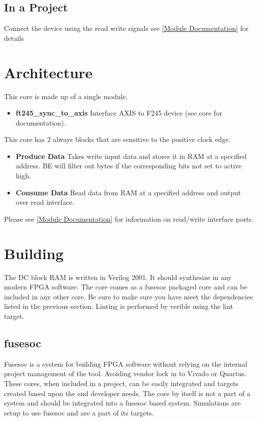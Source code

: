 

\subsection{In a Project}
\par
Connect the device using the read write signals see \ref{Module Documentation} for details

\section{Architecture}
\par
This core is made up of a single module.
\begin{itemize}
  \item \textbf{ft245\_sync\_to\_axis} Interface AXIS to F245 device (see core for documentation).
\end{itemize}

\par
This core has 2 always blocks that are sensitive to the positive clock edge.

\begin{itemize}
\item \textbf{Produce Data} Takes write input data and stores it in RAM at a specified address. BE will filter out bytes if the corresponding bits not set to active high.
\item \textbf{Consume Data} Read data from RAM at a specified address and output over read interface.
\end{itemize}

Please see \ref{Module Documentation} for information on read/write interface ports.

\section{Building}

\par
The DC block RAM is written in Verilog 2001. It should synthesize in any modern FPGA software. The core comes as a fusesoc packaged core and can be included in any other core. Be sure to make sure you have meet the dependencies listed in the previous section. Linting is performed by verible using the lint target.

\subsection{fusesoc}
\par
Fusesoc is a system for building FPGA software without relying on the internal project management of the tool. Avoiding vendor lock in to Vivado or Quartus.
These cores, when included in a project, can be easily integrated and targets created based upon the end developer needs. The core by itself is not a part of
a system and should be integrated into a fusesoc based system. Simulations are setup to use fusesoc and are a part of its targets.

